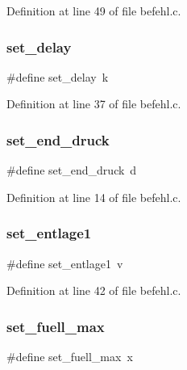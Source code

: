 Definition at line 49 of file befehl.\+c.

\mbox{\label{befehl_8c_a9b7750f5d2fd4cbe50fa61d99e411adc}} 
\subsubsection{set\+\_\+delay}
{\footnotesize\ttfamily \#define set\+\_\+delay~\textquotesingle{}k\textquotesingle{}}



Definition at line 37 of file befehl.\+c.

\mbox{\label{befehl_8c_afa2a732461f554faf375a79ed895fb9c}} 
\subsubsection{set\+\_\+end\+\_\+druck}
{\footnotesize\ttfamily \#define set\+\_\+end\+\_\+druck~\textquotesingle{}d\textquotesingle{}}



Definition at line 14 of file befehl.\+c.

\mbox{\label{befehl_8c_a6c124ba9b5db361c8b816c6446d1ae95}} 
\subsubsection{set\+\_\+entlage1}
{\footnotesize\ttfamily \#define set\+\_\+entlage1~\textquotesingle{}v\textquotesingle{}}



Definition at line 42 of file befehl.\+c.

\mbox{\label{befehl_8c_af307f82ebedae4f4b1de683efce43bb8}} 
\subsubsection{set\+\_\+fuell\+\_\+max}
{\footnotesize\ttfamily \#define set\+\_\+fuell\+\_\+max~\textquotesingle{}x\textquotesingle{}}



